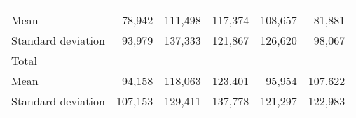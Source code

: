 \begin{tabular}{llllll}
  \multicolumn{1}{|r}{} &
  \multicolumn{1}{r}{} &
  \multicolumn{1}{r}{} &
  \multicolumn{1}{r}{} &
  \multicolumn{1}{r}{} \\
\multicolumn{1}{l}{\hspace{4em}Mean} &
  \multicolumn{1}{|r}{78,942} &
  \multicolumn{1}{r}{111,498} &
  \multicolumn{1}{r}{117,374} &
  \multicolumn{1}{r}{108,657} &
  \multicolumn{1}{r}{81,881} \\
\multicolumn{1}{l}{\hspace{4em}Standard deviation} &
  \multicolumn{1}{|r}{93,979} &
  \multicolumn{1}{r}{137,333} &
  \multicolumn{1}{r}{121,867} &
  \multicolumn{1}{r}{126,620} &
  \multicolumn{1}{r}{98,067} \\
\multicolumn{1}{l}{\hspace{3em}Total} &
  \multicolumn{1}{|r}{} &
  \multicolumn{1}{r}{} &
  \multicolumn{1}{r}{} &
  \multicolumn{1}{r}{} &
  \multicolumn{1}{r}{} \\
\multicolumn{1}{l}{\hspace{4em}Mean} &
  \multicolumn{1}{|r}{94,158} &
  \multicolumn{1}{r}{118,063} &
  \multicolumn{1}{r}{123,401} &
  \multicolumn{1}{r}{95,954} &
  \multicolumn{1}{r}{107,622} \\
\multicolumn{1}{l}{\hspace{4em}Standard deviation} &
  \multicolumn{1}{|r}{107,153} &
  \multicolumn{1}{r}{129,411} &
  \multicolumn{1}{r}{137,778} &
  \multicolumn{1}{r}{121,297} &
  \multicolumn{1}{r}{122,983} \\
\cline{1-6}
\end{tabular}
